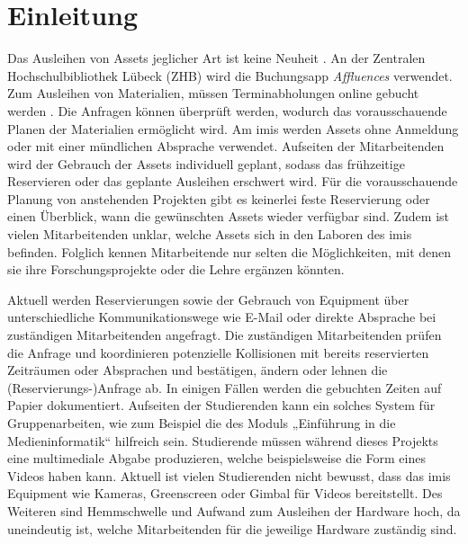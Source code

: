 
\chapter{Einleitung}

Das Ausleihen von Assets jeglicher Art ist keine Neuheit . An der Zentralen
Hochschulbibliothek Lübeck (ZHB) wird die Buchungsapp \textit{Affluences} verwendet. Zum Ausleihen von
Materialien, müssen Terminabholungen online gebucht werden . Die Anfragen können
überprüft werden, wodurch das vorausschauende Planen der Materialien ermöglicht wird. Am \ac{imis}
werden Assets ohne Anmeldung oder mit einer mündlichen Absprache verwendet. Aufseiten der
Mitarbeitenden wird der Gebrauch der Assets individuell geplant, sodass das frühzeitige Reservieren
oder das geplante Ausleihen erschwert wird. Für die vorausschauende Planung von anstehenden
Projekten gibt es keinerlei feste Reservierung oder einen Überblick, wann die gewünschten Assets
wieder verfügbar sind. Zudem ist vielen Mitarbeitenden unklar, welche Assets sich in den Laboren des
\ac{imis} befinden. Folglich kennen Mitarbeitende nur selten die Möglichkeiten, mit denen sie ihre
Forschungsprojekte oder die Lehre ergänzen könnten.

Aktuell werden Reservierungen sowie der Gebrauch von Equipment über unterschiedliche
Kommunikationswege wie E-Mail oder direkte Absprache bei zuständigen Mitarbeitenden angefragt. Die
zuständigen Mitarbeitenden prüfen die Anfrage und koordinieren potenzielle Kollisionen mit bereits
reservierten Zeiträumen oder Absprachen und bestätigen, ändern oder lehnen die
(Reservierungs-)Anfrage ab. In einigen Fällen werden die gebuchten Zeiten auf Papier dokumentiert.
Aufseiten der Studierenden kann ein solches System für Gruppenarbeiten, wie zum Beispiel die des Moduls
„Einführung in die Medieninformatik“ hilfreich sein. Studierende müssen während dieses Projekts eine
multimediale Abgabe produzieren, welche beispielsweise die Form eines Videos haben kann. Aktuell ist
vielen Studierenden nicht bewusst, dass das \ac{imis} Equipment wie Kameras, Greenscreen oder Gimbal für
Videos bereitstellt. Des Weiteren sind Hemmschwelle und Aufwand zum Ausleihen der Hardware hoch, da
uneindeutig ist, welche Mitarbeitenden für die jeweilige Hardware zuständig sind.


